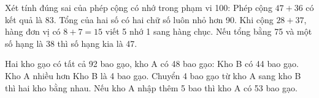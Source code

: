 \begin{ex} %
Xét tính đúng sai của phép cộng có nhớ trong phạm vi 100:
\choiceTF
{\True Phép cộng $47 + 36$ có kết quả là $83$.}
{Tổng của hai số có hai chữ số luôn nhỏ hơn 90.}
{\True Khi cộng $28 + 37$, hàng đơn vị có $8 + 7 = 15$ viết 5 nhớ 1 sang hàng chục.}
{Nếu tổng bằng 75 và một số hạng là 38 thì số hạng kia là 47.}
\end{ex}

\begin{ex} %
Hai kho gạo có tất cả 92 bao gạo, kho A có 48 bao gạo:
\choiceTF
{\True Kho B có 44 bao gạo.}
{\True Kho A nhiều hơn Kho B là 4 bao gạo.}
{Chuyển 4 bao gạo từ kho A sang kho B thì hai kho bằng nhau.}
{\True Nếu kho A nhập thêm 5 bao thì kho A có 53 bao gạo.}
\end{ex}

